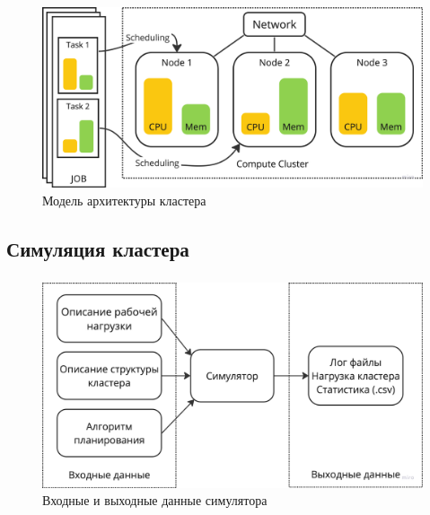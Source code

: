 \documentclass[t]{beamer}  %
\begin{document}
	\begin{frame}[fragile]
    \frametitle{\insertsection} 
	\framesubtitle{\insertsubsection}
	\vspace{0.1cm}	
	\begin{figure}[H]
		\centering
			\includegraphics[width=\linewidth]{images/cluster_network}
			\vspace{0.1cm}
			\caption*{Модель архитектуры кластера}
		\end{figure}


	\end{frame}

	\subsection{Симуляция кластера}

	\begin{frame}[fragile]
		\frametitle{\insertsection} 
		\framesubtitle{\insertsubsection}
		\vspace{0.1cm}	
		\begin{figure}[H]
			\centering
				\includegraphics[width=\linewidth]{images/input_output_data}
				\vspace{0.1cm}
				\caption*{Входные и выходные данные симулятора}
			\end{figure}
	
	
		\end{frame}
\end{document}

